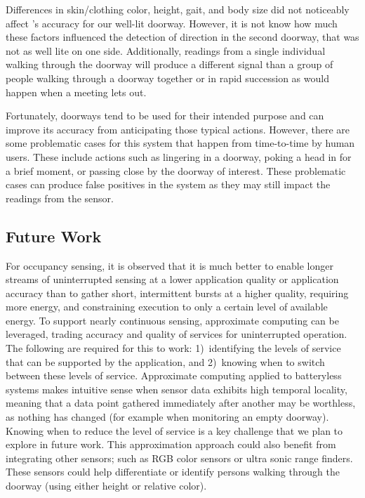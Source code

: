  Differences in skin/clothing color, height, gait, and body size did not noticeably affect \sysname's accuracy for our well-lit doorway.  However, it is not know how much these factors influenced the detection of direction in the second doorway, that was not as well lite on one side.
Additionally, readings from a single individual walking through the doorway will produce a different signal than a group of people walking through a doorway together or in rapid succession as would happen when a meeting lets out.

 Fortunately, doorways tend to be used for their intended purpose and \sysname can improve its accuracy from anticipating those typical actions.  However, there are some problematic cases for this system that happen from time-to-time by human users.  These include actions such as lingering in a doorway, poking a head in for a brief moment, or passing close by the doorway of interest.  These problematic cases can produce false positives in the system as they may still impact the readings from the sensor. 


\subsection{Future Work}
For occupancy sensing, it is observed that it is much better to enable longer streams of uninterrupted sensing at a lower application quality or application accuracy than to gather short, intermittent bursts at a higher quality, requiring more energy, and constraining execution to only a certain level of available energy.
To support nearly continuous sensing, approximate computing can be leveraged, trading accuracy and quality of services for uninterrupted operation.
The following are required for this to work: 1)~identifying the levels of service that can be supported by the application, and 2)~knowing when to switch between these levels of service.
Approximate computing applied to batteryless systems makes intuitive sense when sensor data exhibits high temporal locality, meaning that a data point gathered immediately after another may be worthless, as nothing has changed (for example when monitoring an empty doorway).
Knowing when to reduce the level of service is a key challenge that we plan to explore in future work.
This approximation approach could also benefit from integrating other sensors; such as RGB color sensors or ultra sonic range finders.
These sensors could help differentiate or identify persons walking through the doorway (using either height or relative color).

